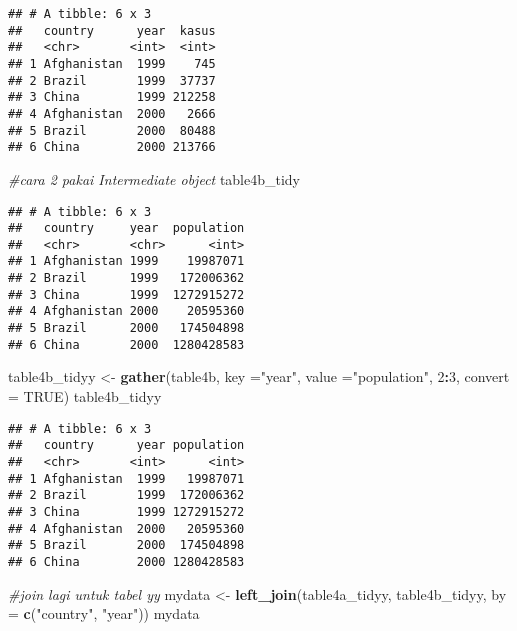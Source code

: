 \documentclass[]{article}
\newenvironment{Shaded}{\begin{snugshade}}{\end{snugshade}}
\newcommand{\CommentTok}[1]{\textcolor[rgb]{0.56,0.35,0.01}{\textit{#1}}}
\newcommand{\DataTypeTok}[1]{\textcolor[rgb]{0.13,0.29,0.53}{#1}}
\newcommand{\DecValTok}[1]{\textcolor[rgb]{0.00,0.00,0.81}{#1}}
\newcommand{\KeywordTok}[1]{\textcolor[rgb]{0.13,0.29,0.53}{\textbf{#1}}}
\newcommand{\NormalTok}[1]{#1}
\newcommand{\OperatorTok}[1]{\textcolor[rgb]{0.81,0.36,0.00}{\textbf{#1}}}
\newcommand{\OtherTok}[1]{\textcolor[rgb]{0.56,0.35,0.01}{#1}}
\newcommand{\StringTok}[1]{\textcolor[rgb]{0.31,0.60,0.02}{#1}}
\begin{document}
\begin{verbatim}
## # A tibble: 6 x 3
##   country      year  kasus
##   <chr>       <int>  <int>
## 1 Afghanistan  1999    745
## 2 Brazil       1999  37737
## 3 China        1999 212258
## 4 Afghanistan  2000   2666
## 5 Brazil       2000  80488
## 6 China        2000 213766
\end{verbatim}

\begin{Shaded}
\begin{Highlighting}[]
\CommentTok{#cara 2 pakai Intermediate object}
\NormalTok{table4b_tidy}
\end{Highlighting}
\end{Shaded}

\begin{verbatim}
## # A tibble: 6 x 3
##   country     year  population
##   <chr>       <chr>      <int>
## 1 Afghanistan 1999    19987071
## 2 Brazil      1999   172006362
## 3 China       1999  1272915272
## 4 Afghanistan 2000    20595360
## 5 Brazil      2000   174504898
## 6 China       2000  1280428583
\end{verbatim}

\begin{Shaded}
\begin{Highlighting}[]
\NormalTok{table4b_tidyy <-}\StringTok{ }\KeywordTok{gather}\NormalTok{(table4b, }\DataTypeTok{key =}\StringTok{"year"}\NormalTok{, }\DataTypeTok{value =}\StringTok{"population"}\NormalTok{, }\DecValTok{2}\OperatorTok{:}\DecValTok{3}\NormalTok{, }\DataTypeTok{convert =} \OtherTok{TRUE}\NormalTok{)}
\NormalTok{table4b_tidyy}
\end{Highlighting}
\end{Shaded}

\begin{verbatim}
## # A tibble: 6 x 3
##   country      year population
##   <chr>       <int>      <int>
## 1 Afghanistan  1999   19987071
## 2 Brazil       1999  172006362
## 3 China        1999 1272915272
## 4 Afghanistan  2000   20595360
## 5 Brazil       2000  174504898
## 6 China        2000 1280428583
\end{verbatim}

\begin{Shaded}
\begin{Highlighting}[]
\CommentTok{#join lagi untuk tabel yy}
\NormalTok{mydata <-}\StringTok{ }\KeywordTok{left_join}\NormalTok{(table4a_tidyy, table4b_tidyy, }\DataTypeTok{by =} \KeywordTok{c}\NormalTok{(}\StringTok{"country"}\NormalTok{, }\StringTok{"year"}\NormalTok{))}
\NormalTok{mydata}
\end{Highlighting}
\end{Shaded}
\end{document}
